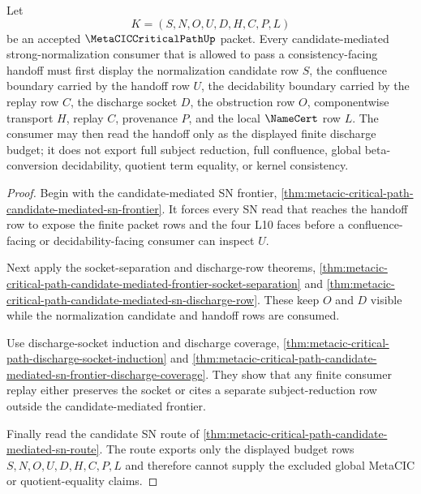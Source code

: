 \begin{theorem}
\label{thm:metacic-criticalpath-candidate-mediated-sn-discharge-budget}
Let
$$
K=(S,N,O,U,D,H,C,P,L)
$$
be an accepted $\MetaCICCriticalPathUp$ packet. Every candidate-mediated strong-normalization consumer that is allowed to pass a consistency-facing handoff must first display the normalization candidate row $S$, the confluence boundary carried by the handoff row $U$, the decidability boundary carried by the replay row $C$, the discharge socket $D$, the obstruction row $O$, componentwise transport $H$, replay $C$, provenance $P$, and the local $\NameCert$ row $L$. The consumer may then read the handoff only as the displayed finite discharge budget; it does not export full subject reduction, full confluence, global beta-conversion decidability, quotient term equality, or kernel consistency.
\end{theorem}
\begin{proof}
Begin with the candidate-mediated SN frontier, \autoref{thm:metacic-critical-path-candidate-mediated-sn-frontier}. It forces every SN read that reaches the handoff row to expose the finite packet rows and the four L10 faces before a confluence-facing or decidability-facing consumer can inspect $U$.

Next apply the socket-separation and discharge-row theorems, \autoref{thm:metacic-critical-path-candidate-mediated-frontier-socket-separation} and \autoref{thm:metacic-critical-path-candidate-mediated-sn-discharge-row}. These keep $O$ and $D$ visible while the normalization candidate and handoff rows are consumed.

Use discharge-socket induction and discharge coverage, \autoref{thm:metacic-critical-path-discharge-socket-induction} and \autoref{thm:metacic-critical-path-candidate-mediated-sn-frontier-discharge-coverage}. They show that any finite consumer replay either preserves the socket or cites a separate subject-reduction row outside the candidate-mediated frontier.

Finally read the candidate SN route of \autoref{thm:metacic-critical-path-candidate-mediated-sn-route}. The route exports only the displayed budget rows $S,N,O,U,D,H,C,P,L$ and therefore cannot supply the excluded global MetaCIC or quotient-equality claims.
\end{proof}

